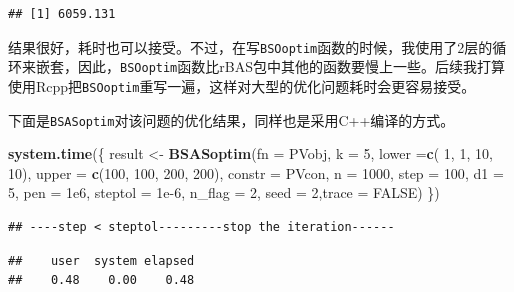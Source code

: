 \documentclass[]{ctexbook}
\newenvironment{Shaded}{\begin{snugshade}}{\end{snugshade}}
\newcommand{\KeywordTok}[1]{\textcolor[rgb]{0.13,0.29,0.53}{\textbf{#1}}}
\newcommand{\DataTypeTok}[1]{\textcolor[rgb]{0.13,0.29,0.53}{#1}}
\newcommand{\DecValTok}[1]{\textcolor[rgb]{0.00,0.00,0.81}{#1}}
\newcommand{\FloatTok}[1]{\textcolor[rgb]{0.00,0.00,0.81}{#1}}
\newcommand{\StringTok}[1]{\textcolor[rgb]{0.31,0.60,0.02}{#1}}
\newcommand{\OtherTok}[1]{\textcolor[rgb]{0.56,0.35,0.01}{#1}}
\newcommand{\OperatorTok}[1]{\textcolor[rgb]{0.81,0.36,0.00}{\textbf{#1}}}
\newcommand{\NormalTok}[1]{#1}
\begin{document}
\begin{verbatim}
## [1] 6059.131
\end{verbatim}

结果很好，耗时也可以接受。不过，在写\texttt{BSOoptim}函数的时候，我使用了2层的循环来嵌套，因此，\texttt{BSOoptim}函数比rBAS包中其他的函数要慢上一些。后续我打算使用Rcpp把\texttt{BSOoptim}重写一遍，这样对大型的优化问题耗时会更容易接受。

下面是\texttt{BSASoptim}对该问题的优化结果，同样也是采用C++编译的方式。

\begin{Shaded}
\begin{Highlighting}[]
\KeywordTok{system.time}\NormalTok{(\{}
\NormalTok{  result <-}\StringTok{ }\KeywordTok{BSASoptim}\NormalTok{(}\DataTypeTok{fn =}\NormalTok{ PVobj,}
                      \DataTypeTok{k =} \DecValTok{5}\NormalTok{,}
                      \DataTypeTok{lower =}\KeywordTok{c}\NormalTok{( }\DecValTok{1}\NormalTok{, }\DecValTok{1}\NormalTok{, }\DecValTok{10}\NormalTok{, }\DecValTok{10}\NormalTok{),}
                      \DataTypeTok{upper =} \KeywordTok{c}\NormalTok{(}\DecValTok{100}\NormalTok{, }\DecValTok{100}\NormalTok{, }\DecValTok{200}\NormalTok{, }\DecValTok{200}\NormalTok{),}
                      \DataTypeTok{constr =}\NormalTok{ PVcon,}
                      \DataTypeTok{n =} \DecValTok{1000}\NormalTok{,}
                      \DataTypeTok{step =} \DecValTok{100}\NormalTok{,}
                      \DataTypeTok{d1 =} \DecValTok{5}\NormalTok{,}
                      \DataTypeTok{pen =} \FloatTok{1e6}\NormalTok{,}
                      \DataTypeTok{steptol =} \FloatTok{1e-6}\NormalTok{,}
                      \DataTypeTok{n_flag =} \DecValTok{2}\NormalTok{,}
                      \DataTypeTok{seed =} \DecValTok{2}\NormalTok{,}\DataTypeTok{trace =} \OtherTok{FALSE}\NormalTok{)}
\NormalTok{\})}
\end{Highlighting}
\end{Shaded}

\begin{verbatim}
## ----step < steptol---------stop the iteration------
\end{verbatim}

\begin{verbatim}
##    user  system elapsed 
##    0.48    0.00    0.48
\end{verbatim}

\begin{Shaded}
\end{Shaded}
\end{document}
